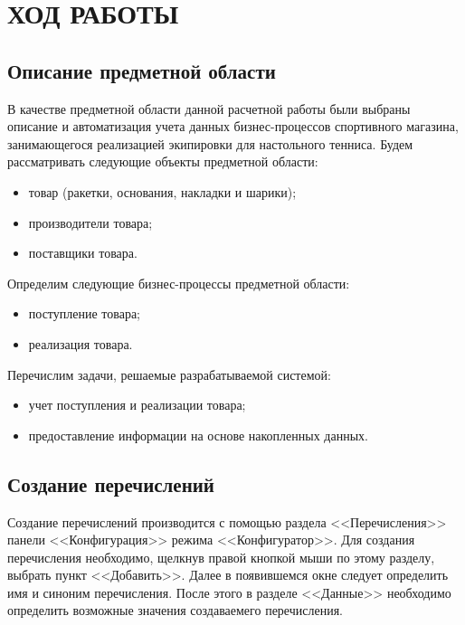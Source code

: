 \section[Ход работы]{ХОД РАБОТЫ}

\subsection{Описание предметной области}

В качестве предметной области данной расчетной работы были выбраны
описание и автоматизация учета данных бизнес-процессов спортивного магазина,
занимающегося реализацией экипировки для настольного тенниса.
Будем рассматривать следующие объекты предметной области:
\begin{itemize}
\item товар (ракетки, основания, накладки и шарики);
\item производители товара;
\item поставщики товара.
\end{itemize}

Определим следующие бизнес-процессы предметной области:
\begin{itemize}
\item поступление товара;
\item реализация товара.
\end{itemize}

Перечислим задачи, решаемые разрабатываемой системой:
\begin{itemize}
\item учет поступления и реализации товара;
\item предоставление информации на основе накопленных данных.
\end{itemize}

\subsection{Создание перечислений}

Создание перечислений производится с помощью раздела <<Перечисления>>
панели <<Конфигурация>> режима <<Конфигуратор>>.
Для создания перечисления необходимо, щелкнув правой кнопкой мыши по этому
разделу, выбрать пункт <<Добавить>>. Далее в появившемся окне
следует определить имя и синоним перечисления.
После этого в разделе <<Данные>> необходимо определить возможные значения
создаваемего перечисления.

